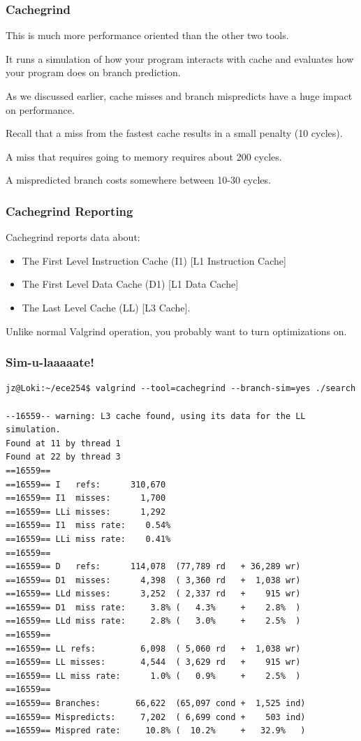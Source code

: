 \begin{frame}
\frametitle{Cachegrind}

This is much more performance oriented than the other two tools. 

 It runs a simulation of how your program interacts with cache and evaluates how your program does on branch prediction.
 
 As we discussed earlier, cache misses and branch mispredicts have a huge impact on performance.
 
 Recall that a miss from the fastest cache results in a small penalty (10 cycles).
 
 A miss that requires going to memory requires about 200 cycles. 
 
 A mispredicted branch costs somewhere between 10-30 cycles.


\end{frame}

\begin{frame}
\frametitle{Cachegrind Reporting}

Cachegrind reports data about:
\begin{itemize}
	\item The First Level Instruction Cache (I1) [L1 Instruction Cache]
	\item The First Level Data Cache (D1) [L1 Data Cache]
	\item The Last Level Cache (LL) [L3 Cache].
\end{itemize}

Unlike normal Valgrind operation, you probably want to turn optimizations on.

\end{frame}

\begin{frame}[fragile]
\frametitle{Sim-u-laaaaate!}
{\scriptsize

\begin{verbatim}
jz@Loki:~/ece254$ valgrind --tool=cachegrind --branch-sim=yes ./search

--16559-- warning: L3 cache found, using its data for the LL simulation.
Found at 11 by thread 1 
Found at 22 by thread 3 
==16559== 
==16559== I   refs:      310,670
==16559== I1  misses:      1,700
==16559== LLi misses:      1,292
==16559== I1  miss rate:    0.54%
==16559== LLi miss rate:    0.41%
==16559== 
==16559== D   refs:      114,078  (77,789 rd   + 36,289 wr)
==16559== D1  misses:      4,398  ( 3,360 rd   +  1,038 wr)
==16559== LLd misses:      3,252  ( 2,337 rd   +    915 wr)
==16559== D1  miss rate:     3.8% (   4.3%     +    2.8%  )
==16559== LLd miss rate:     2.8% (   3.0%     +    2.5%  )
==16559== 
==16559== LL refs:         6,098  ( 5,060 rd   +  1,038 wr)
==16559== LL misses:       4,544  ( 3,629 rd   +    915 wr)
==16559== LL miss rate:      1.0% (   0.9%     +    2.5%  )
==16559== 
==16559== Branches:       66,622  (65,097 cond +  1,525 ind)
==16559== Mispredicts:     7,202  ( 6,699 cond +    503 ind)
==16559== Mispred rate:     10.8% (  10.2%     +   32.9%   )

\end{verbatim}
}

\end{frame}

